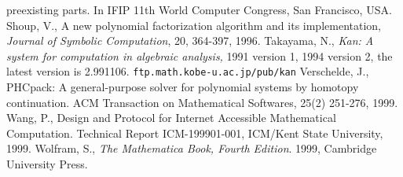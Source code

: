 \begin{thebibliography}{X}
preexisting parts.
In IFIP 11th World Computer Congress, San Francisco, USA.
Shoup, V., 
A new polynomial factorization algorithm and 
its implementation,
{\sl Journal of Symbolic Computation}, 20, 364-397, 1996.
	Takayama, N.,
	{\em Kan: A system for computation in
	algebraic analysis,} 1991 version 1,
        1994 version 2, the latest version is 2.991106. 
	{\tt \small ftp.math.kobe-u.ac.jp/pub/kan}
Verschelde, J.,
PHCpack: A general-purpose solver for polynomial systems by
homotopy continuation.  ACM Transaction on Mathematical Softwares, 25(2) 
251-276, 1999.
Wang, P.,
Design and Protocol for Internet Accessible Mathematical Computation.
Technical Report ICM-199901-001, ICM/Kent State University, 1999.
Wolfram, S.,
{\it The Mathematica Book, Fourth Edition}.
1999, Cambridge University Press.
\end{thebibliography}
